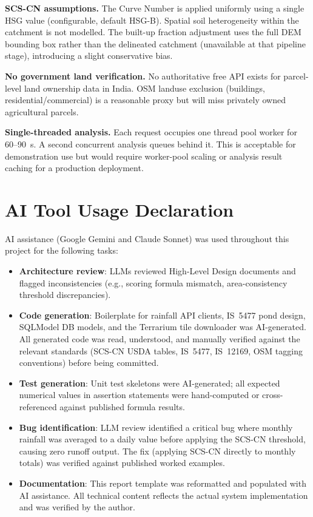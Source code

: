 \documentclass[manuscript,screen,review,nonacm]{acmart}
\begin{document}
\textbf{SCS-CN assumptions.} The Curve Number is applied uniformly using
a single HSG value (configurable, default HSG-B). Spatial soil
heterogeneity within the catchment is not modelled. The built-up fraction
adjustment uses the full DEM bounding box rather than the delineated
catchment (unavailable at that pipeline stage), introducing a slight
conservative bias.

\textbf{No government land verification.} No authoritative free API
exists for parcel-level land ownership data in India. OSM landuse
exclusion (buildings, residential/commercial) is a reasonable proxy but
will miss privately owned agricultural parcels.

\textbf{Single-threaded analysis.} Each request occupies one thread pool
worker for 60--90~s. A second concurrent analysis queues behind it. This
is acceptable for demonstration use but would require worker-pool scaling
or analysis result caching for a production deployment.

\section{AI Tool Usage Declaration}
\label{sec:ai-usage}

AI assistance (Google Gemini and Claude Sonnet) was used throughout this
project for the following tasks:

\begin{itemize}
  \item \textbf{Architecture review}: LLMs reviewed High-Level Design
        documents and flagged inconsistencies (e.g., scoring formula
        mismatch, area-consistency threshold discrepancies).

  \item \textbf{Code generation}: Boilerplate for rainfall API clients,
        IS~5477 pond design, SQLModel DB models, and the Terrarium tile
        downloader was AI-generated. All generated code was read,
        understood, and manually verified against the relevant standards
        (SCS-CN USDA tables, IS~5477, IS~12169, OSM tagging conventions)
        before being committed.

  \item \textbf{Test generation}: Unit test skeletons were AI-generated;
        all expected numerical values in assertion statements were
        hand-computed or cross-referenced against published formula results.

  \item \textbf{Bug identification}: LLM review identified a critical bug
        where monthly rainfall was averaged to a daily value before
        applying the SCS-CN threshold, causing zero runoff output. The fix
        (applying SCS-CN directly to monthly totals) was verified against
        published worked examples.

  \item \textbf{Documentation}: This report template was reformatted and
        populated with AI assistance. All technical content reflects the
        actual system implementation and was verified by the author.
\end{itemize}
\end{document}
